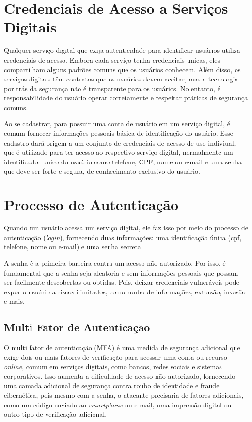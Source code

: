 \documentclass[12pt]{article}
\begin{document}
\section{Credenciais de Acesso a Serviços Digitais} \label{sec:firstpage}

Qualquer serviço digital que exija autenticidade para identificar usuários
utiliza credenciais de acesso.
Embora cada serviço tenha credenciais únicas, eles compartilham alguns
padrões comuns que os usuários conhecem.
Além disso, os serviços digitais têm contratos que os usuários devem aceitar,
mas a tecnologia por trás da segurança não é transparente para os usuários.
No entanto, é responsabilidade do usuário operar corretamente e respeitar
práticas de segurança comuns.

Ao se cadastrar, para possuir uma conta de usuário em um serviço digital,
é comum fornecer informações pessoais básica de identificação do usuário.
Esse cadastro dará origem a um conjunto de credenciais de acesso de uso
indiviual, que é utilizado para ter acesso ao respectivo serviço digital,
normalmente um identificador unico do usuário como telefone, CPF, nome ou
e-mail e uma senha que deve ser forte e segura, de conhecimento exclusivo
do usuário.

\section{Processo de Autenticação}

Quando um usuário acessa um serviço digital, ele faz isso por meio do
processo de autenticação (\textit{login}), fornecendo duas informações: uma
identificação única (cpf, telefone, nome ou e-mail) e uma senha secreta.

A senha é a primeira barreira contra um acesso não autorizado.
Por isso, é fundamental que a senha seja aleatória e sem informações
pessoais que possam ser facilmente descobertas ou obtidas.
Pois, deixar credenciais vulneráveis pode expor o usuário a riscos ilimitados,
como roubo de informações, extorsão, invasão e mais.

\subsection{Multi Fator de Autenticação}

O multi fator de autenticação (MFA) é uma medida de segurança adicional que
exige dois ou mais fatores de verificação para acessar uma conta ou
recurso \textit{online}, comum em serviços digitais, como bancos, redes sociais e
sistemas corporativos.
Isso aumenta a dificuldade de acesso não autorizado, fornecendo uma camada
adicional de segurança contra roubo de identidade e fraude cibernética, pois
mesmo com a senha, o atacante precisaria de fatores adicionais, como um código
enviado ao \textit{smartphone} ou e-mail, uma impressão digital ou outro tipo de
verificação adicional.
\end{document}

